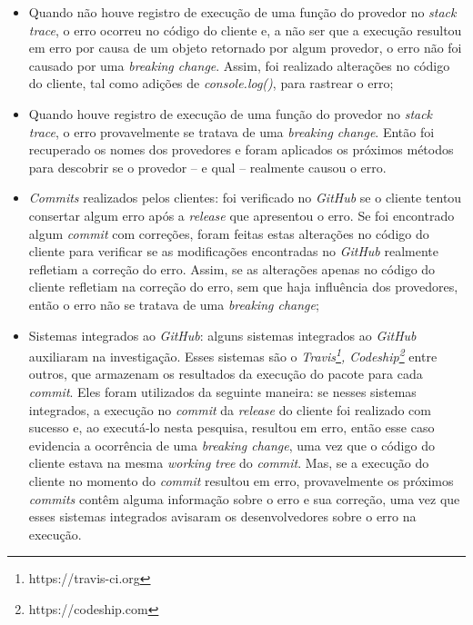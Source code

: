 \begin{itemize}
    \item Quando não houve registro de execução de uma função do provedor no \textit{stack trace}, o erro ocorreu no código do cliente e, a não ser que a execução resultou em erro por causa de um objeto retornado por algum provedor, o erro não foi causado por uma \textit{breaking change}. Assim, foi realizado alterações no código do cliente, tal como adições de \textit{console.log()}, para rastrear o erro;
    \item Quando houve registro de execução de uma função do provedor no \textit{stack trace}, o erro provavelmente se tratava de uma \textit{breaking change}. Então foi recuperado os nomes dos provedores e foram aplicados os próximos métodos para descobrir se o provedor -- e qual -- realmente causou o erro.

    \item \textit{Commits} realizados pelos clientes: foi verificado no \textit{GitHub} se o cliente tentou consertar algum erro após a \textit{release} que apresentou o erro. Se foi encontrado algum \textit{commit} com correções, foram feitas estas alterações no código do cliente para verificar se as modificações encontradas no \textit{GitHub} realmente refletiam a correção do erro. Assim, se as alterações apenas no código do cliente refletiam na correção do erro, sem que haja influência dos provedores, então o erro não se tratava de uma \textit{breaking change};

    \item Sistemas integrados ao \textit{GitHub}: alguns sistemas integrados ao \textit{GitHub} auxiliaram na investigação. Esses sistemas são o \textit{Travis\footnote{https://travis-ci.org}, Codeship\footnote{https://codeship.com}} entre outros, que armazenam os resultados da execução do pacote para cada \textit{commit}. Eles foram utilizados da seguinte maneira: se nesses sistemas integrados, a execução no \textit{commit} da \textit{release} do cliente foi realizado com sucesso e, ao executá-lo nesta pesquisa, resultou em erro, então esse caso evidencia a ocorrência de uma \textit{breaking change}, uma vez que o código do cliente estava na mesma \textit{working tree} do \textit{commit}. Mas, se a execução do cliente no momento do \textit{commit} resultou em erro, provavelmente os próximos \textit{commits} contêm alguma informação sobre o erro e sua correção, uma vez que esses sistemas integrados avisaram os desenvolvedores sobre o erro na execução.
    

\end{itemize}
